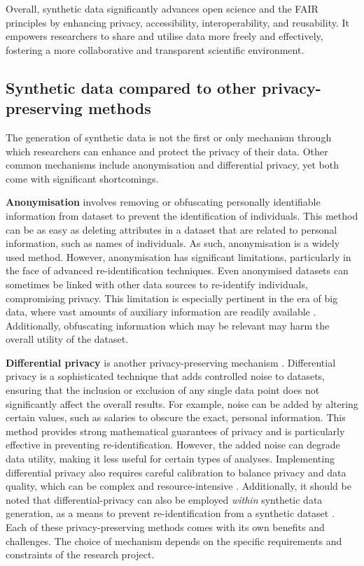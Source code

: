 Overall, synthetic data significantly advances open science and the FAIR principles by enhancing privacy, accessibility, interoperability, and reusability. It empowers researchers to share and utilise data more freely and effectively, fostering a more collaborative and transparent scientific environment. 

\subsection{Synthetic data compared to other privacy-preserving methods}
The generation of synthetic data is not the first or only mechanism through which researchers can enhance and protect the privacy of their data. Other common mechanisms include anonymisation and differential privacy, yet both come with significant shortcomings.

\textbf{Anonymisation} involves removing or obfuscating personally identifiable information from dataset to prevent the identification of individuals. This method can be as easy as deleting attributes in a dataset that are related to personal information, such as names of individuals. As such, anonymisation is a widely used method. However, anonymisation has significant limitations, particularly in the face of advanced re-identification techniques. Even anonymised datasets can sometimes be linked with other data sources to re-identify individuals, compromising privacy. This limitation is especially pertinent in the era of big data, where vast amounts of auxiliary information are readily available \cite{majeed2020anonymization}. Additionally, obfuscating information which may be relevant may harm the overall utility of the dataset.

\textbf{Differential privacy} is another privacy-preserving mechanism \cite{dwork2006differential}. Differential privacy is a sophisticated technique that adds controlled noise to datasets, ensuring that the inclusion or exclusion of any single data point does not significantly affect the overall results. For example, noise can be added by altering certain values, such as salaries to obscure the exact, personal information. This method provides strong mathematical guarantees of privacy and is particularly effective in preventing re-identification. However, the added noise can degrade data utility, making it less useful for certain types of analyses. Implementing differential privacy also requires careful calibration to balance privacy and data quality, which can be complex and resource-intensive \cite{wasserman2010statistical,wood2018differential}. Additionally, it should be noted that differential-privacy can also be employed \textit{within} synthetic data generation, as a means to prevent re-identification from a synthetic dataset \cite{jordon2018pate,xin2022federated,sun2023generating}. \\


Each of these privacy-preserving methods comes with its own benefits and challenges. The choice of mechanism depends on the specific requirements and constraints of the research project.